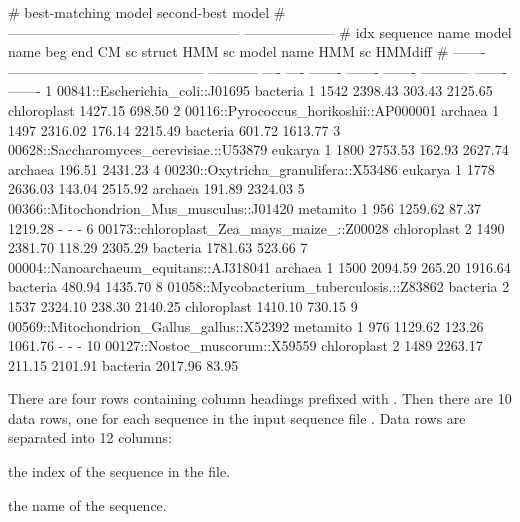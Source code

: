 \begin{sreoutputtinywide}
#                                                                     best-matching model                   second-best model  
#                                                      --------------------------------------------------  --------------------
#     idx  sequence name                               model name    beg   end    CM sc   struct   HMM sc  model name    HMM sc  HMMdiff
# -------  ------------------------------------------  -----------  ----  ----  -------  -------  -------  -----------  -------  -------
        1  00841::Escherichia_coli::J01695             bacteria        1  1542  2398.43   303.43  2125.65  chloroplast  1427.15   698.50
        2  00116::Pyrococcus_horikoshii::AP000001      archaea         1  1497  2316.02   176.14  2215.49  bacteria      601.72  1613.77
        3  00628::Saccharomyces_cerevisiae.::U53879    eukarya         1  1800  2753.53   162.93  2627.74  archaea       196.51  2431.23
        4  00230::Oxytricha_granulifera::X53486        eukarya         1  1778  2636.03   143.04  2515.92  archaea       191.89  2324.03
        5  00366::Mitochondrion_Mus_musculus::J01420   metamito        1   956  1259.62    87.37  1219.28  -                  -        -
        6  00173::chloroplast_Zea_mays_maize_::Z00028  chloroplast     2  1490  2381.70   118.29  2305.29  bacteria     1781.63   523.66
        7  00004::Nanoarchaeum_equitans::AJ318041      archaea         1  1500  2094.59   265.20  1916.64  bacteria      480.94  1435.70
        8  01058::Mycobacterium_tuberculosis.::Z83862  bacteria        2  1537  2324.10   238.30  2140.25  chloroplast  1410.10   730.15
        9  00569::Mitochondrion_Gallus_gallus::X52392  metamito        1   976  1129.62   123.26  1061.76  -                  -        -
       10  00127::Nostoc_muscorum::X59559              chloroplast     2  1489  2263.17   211.15  2101.91  bacteria     2017.96    83.95
\end{sreoutputtinywide}

There are four rows containing column headings prefixed with
\prog{\#}. Then there are 10 data rows, one for each sequence in the
input sequence file . Data rows are
separated into 12 columns:

\begin{wideitem}
\item[\emprog{idx}] the index of the sequence in the file.

\item[\emprog{sequence name}] the name of the sequence.
\end{wideitem}

